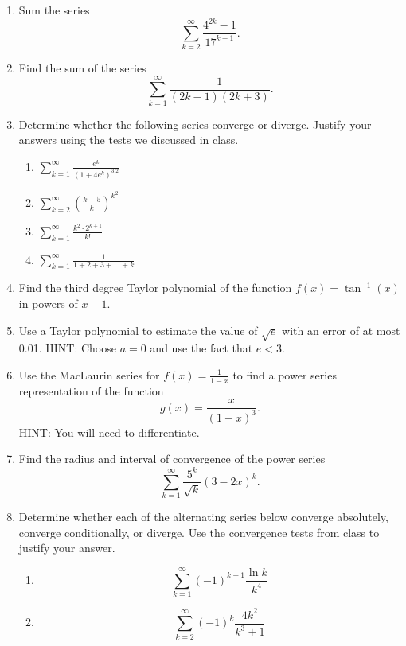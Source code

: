\documentclass[12pt]{article}
\begin{document}
\begin{enumerate}

\item
 Sum the series
$$\sum_{k=2}^{\infty} {\frac{4^{2k} - 1}{17^{k-1}}}.$$
\medskip

\item
Find the sum of the series
$$\sum_{k=1}^{\infty} {\frac{1}{(2k-1)(2k+3)}}.$$
\medskip

\item
Determine whether the following series converge or diverge.  Justify your answers using the tests we discussed in class.
\begin{enumerate}
  \item $\sum_{k=1}^{\infty} {\frac{e^k}{(1+4e^k)^{3.2}}}$ 
\medskip
  \item $\sum_{k=2}^{\infty} \left ( {\frac{k-5}{k}} \right 
)^{k^2}$
\medskip
  \item $\sum_{k=1}^{\infty} {\frac{k^2 \cdot 2^{k+1}}{k!}}$
\medskip
   \item $\sum_{k=1}^{\infty} {\frac{1}{1 + 2 + 3 + ... + k}}$
 \medskip
\end{enumerate}
  
\item
Find the third degree Taylor polynomial of the function
$f(x)=\tan^{-1}(x)$ in powers of $x-1$.
\medskip

\item
Use a Taylor polynomial to estimate the value of $\sqrt{e}$ 
with an error of at most 0.01.  HINT: Choose $a=0$ and use the fact that 
$e<3$.

\item 
Use the MacLaurin series for $f(x)={\frac{1}{1-x}}$ to find a power series representation of the function 
$$g(x)={\frac{x}{(1-x)^3}}.$$
HINT: You will need to differentiate.
\medskip

\item 
Find the radius and interval of convergence of the power 
series
$$\sum_{k=1}^{\infty} {\frac{5^k}{\sqrt{k}}} (3-2x)^k.$$
\vfil\eject

\item
Determine whether each of the alternating series below 
converge absolutely, converge conditionally, or diverge.  Use the 
convergence tests from class to justify your answer. 
\begin{enumerate}
\item $$\sum_{k=1}^{\infty} (-1)^{k+1} {\frac{\ln k}{k^4}}$$
\medskip
\item $$\sum_{k=2}^{\infty} (-1)^k {\frac{4k^2}{k^3+1}}$$
\medskip
\end{enumerate}


\end{enumerate}
\end{document}
